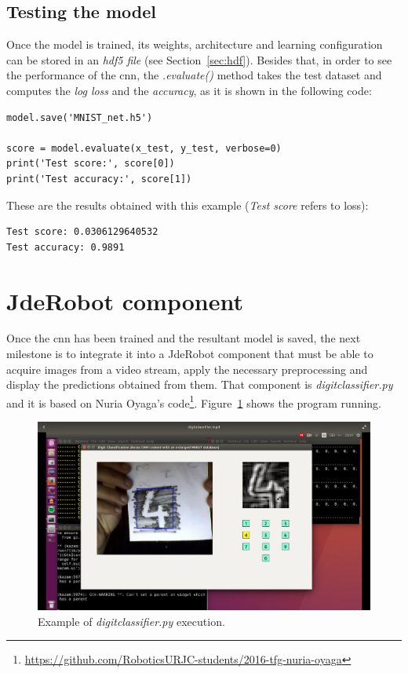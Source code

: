 \subsection{Testing the model}
Once the model is trained, its weights, architecture and learning configuration can be stored in an \emph{\gls{hdf5} file} (see Section~\ref{sec:hdf}). Besides that, in order to see the performance of the \gls{cnn}, the \textit{.evaluate()} method takes the test dataset and computes the \emph{log loss} and the \emph{accuracy}, as it is shown in the following code:
\begin{lstlisting}
model.save('MNIST_net.h5')

score = model.evaluate(x_test, y_test, verbose=0)
print('Test score:', score[0])
print('Test accuracy:', score[1])
\end{lstlisting}
These are the results obtained with this example (\textit{Test score} refers to loss):
\begin{Verbatim}[frame=single]
Test score: 0.0306129640532
Test accuracy: 0.9891
\end{Verbatim}

\section{JdeRobot component}\label{sec:component}
Once the \gls{cnn} has been trained and the resultant model is saved, the next milestone is to integrate it into a JdeRobot component that must be able to acquire images from a video stream, apply the necessary preprocessing and display the predictions obtained from them. That component is \emph{\textit{digitclassifier.py}} and it is based on Nuria Oyaga's code\footnote{\url{https://github.com/RoboticsURJC-students/2016-tfg-nuria-oyaga}}. Figure~\ref{fig:digitclass} shows the program running.

\begin{figure}
	\centering
	\includegraphics[width=1\linewidth, keepaspectratio]{figures/digitclass.png}
	\caption{Example of \textit{digitclassifier.py} execution.}
	\label{fig:digitclass}
\end{figure}

